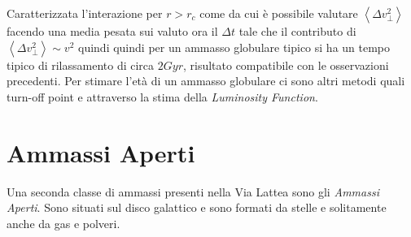 Caratterizzata l'interazione per $r>r_c$ come
da cui \`e possibile valutare $\left\langle\Delta v_{\perp}^2\right\rangle$ facendo una media pesata sui
valuto ora il $\Delta t$ tale che il contributo di $\left\langle\Delta v_{\perp}^2\right\rangle\sim v^2$ quindi
quindi per un ammasso globulare tipico si ha un tempo tipico di rilassamento di circa $2Gyr$, risultato compatibile con le osservazioni precedenti. Per stimare l'et\`a di un ammasso globulare ci sono altri metodi quali turn-off point e attraverso la stima della \emph{Luminosity Function}.
\section{Ammassi Aperti}
Una seconda classe di ammassi presenti nella Via Lattea sono gli \emph{Ammassi Aperti}. Sono situati sul disco galattico e sono formati da stelle e solitamente anche da gas e polveri.

